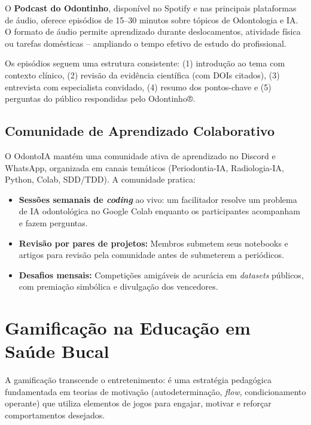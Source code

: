 O \textbf{Podcast do Odontinho}, disponível no Spotify e nas principais
plataformas de áudio, oferece episódios de 15--30 minutos sobre tópicos de
Odontologia e IA. O formato de áudio permite aprendizado durante deslocamentos,
atividade física ou tarefas domésticas -- ampliando o tempo efetivo de estudo do
profissional.

Os episódios seguem uma estrutura consistente: (1) introdução ao tema com
contexto clínico, (2) revisão da evidência científica (com DOIs citados),
(3) entrevista com especialista convidado, (4) resumo dos pontos-chave e
(5) perguntas do público respondidas pelo Odontinho®.

\subsection{Comunidade de Aprendizado Colaborativo}

O OdontoIA mantém uma comunidade ativa de aprendizado no Discord e WhatsApp,
organizada em canais temáticos (Periodontia-IA, Radiologia-IA, Python, Colab,
SDD/TDD). A comunidade pratica:

\begin{itemize}
  \item \textbf{Sessões semanais de \textit{coding}} ao vivo: um facilitador
    resolve um problema de IA odontológica no Google Colab enquanto os
    participantes acompanham e fazem perguntas.
  \item \textbf{Revisão por pares de projetos:} Membros submetem seus notebooks
    e artigos para revisão pela comunidade antes de submeterem a periódicos.
  \item \textbf{Desafios mensais:} Competições amigáveis de acurácia em
    \textit{datasets} públicos, com premiação simbólica e divulgação dos
    vencedores.
\end{itemize}

 

\section{Gamificação na Educação em Saúde Bucal}
\label{sec:gamificacao}

\nivelquatro

A gamificação transcende o entretenimento: é uma estratégia pedagógica
fundamentada em teorias de motivação (autodeterminação, \textit{flow},
condicionamento operante) que utiliza elementos de jogos para engajar,
motivar e reforçar comportamentos desejados.

